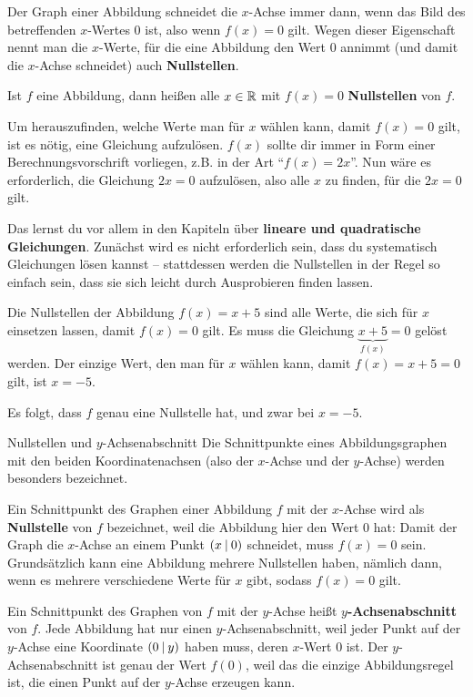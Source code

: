 \documentclass[../../main.tex]{subfiles}
\begin{document}
Der Graph einer Abbildung schneidet die $x$-Achse immer dann, wenn das Bild des betreffenden $x$-Wertes $0$ ist, also wenn $f(x)=0$ gilt. Wegen dieser Eigenschaft nennt man die $x$-Werte, für die eine Abbildung den Wert $0$ annimmt (und damit die $x$-Achse schneidet) auch \textbf{Nullstellen}.

\begin{definition}
    Ist $f$ eine Abbildung, dann heißen alle $x\in\mathbb{R}$ mit $f(x)=0$ \textbf{Nullstellen} von $f$.
\end{definition}

Um herauszufinden, welche Werte man für $x$ wählen kann, damit $f(x)=0$ gilt, ist es nötig, eine Gleichung aufzulösen. $f(x)$ sollte dir immer in Form einer Berechnungsvorschrift vorliegen, z.B. in der Art \enquote{$f(x)=2x$}. Nun wäre es erforderlich, die Gleichung $2x=0$ aufzulösen, also alle $x$ zu finden, für die $2x=0$ gilt. 

Das lernst du vor allem in den Kapiteln über \textbf{lineare und quadratische Gleichungen}. Zunächst wird es nicht erforderlich sein, dass du systematisch Gleichungen lösen kannst -- stattdessen werden die Nullstellen in der Regel so einfach sein, dass sie sich leicht durch Ausprobieren finden lassen.

\begin{example}
    Die Nullstellen der Abbildung $f(x)=x+5$ sind alle Werte, die sich für $x$ einsetzen lassen, damit $f(x)=0$ gilt. Es muss die Gleichung $\underbrace{x+5}_{f(x)}=0$ gelöst werden. Der einzige Wert, den man für $x$ wählen kann, damit $f(x)=x+5=0$ gilt, ist $x=-5$.
    
    Es folgt, dass $f$ genau eine Nullstelle hat, und zwar bei $x=-5$.
\end{example}

\begin{nutshell}{Nullstellen und $y$-Achsenabschnitt}
    Die Schnittpunkte eines Abbildungsgraphen mit den beiden Koordinatenachsen (also der $x$-Achse und der $y$-Achse) werden besonders bezeichnet.
    
    Ein Schnittpunkt des Graphen einer Abbildung $f$ mit der $x$-Achse wird als \textbf{Nullstelle} von $f$ bezeichnet, weil die Abbildung hier den Wert 0 hat: Damit der Graph die $x$-Achse an einem Punkt $\left(x \:\middle|\: 0\right)$ schneidet, muss $f(x)=0$ sein. Grundsätzlich kann eine Abbildung mehrere Nullstellen haben, nämlich dann, wenn es mehrere verschiedene Werte für $x$ gibt, sodass $f(x)=0$ gilt.
    
    Ein Schnittpunkt des Graphen von $f$ mit der $y$-Achse heißt \textbf{$y$-Achsenabschnitt} von $f$. Jede Abbildung hat nur einen $y$-Achsenabschnitt, weil jeder Punkt auf der $y$-Achse eine Koordinate $\left(0 \:\middle|\: y\right)$ haben muss, deren $x$-Wert 0 ist. Der $y$-Achsenabschnitt ist genau der Wert $f(0)$, weil das die einzige Abbildungsregel ist, die einen Punkt auf der $y$-Achse erzeugen kann.
\end{nutshell}
\end{document}
